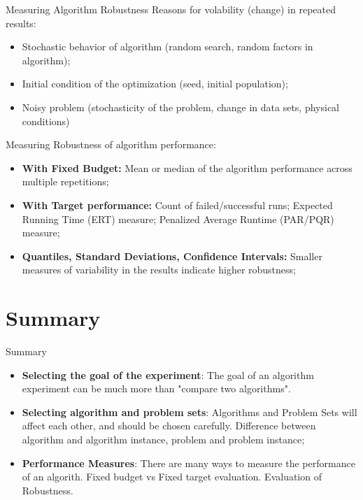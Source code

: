 \documentclass[aspectratio=169]{beamer}
\begin{document}
\begin{frame}[t]{Measuring Algorithm Robustness}
  Reasons for volability (change) in repeated results: 
  \begin{itemize}
    \item Stochastic behavior of algorithm (random search, random factors in algorithm);
    \item Initial condition of the optimization (seed, initial population);
    \item Noisy problem (stochasticity of the problem, change in data sets, physical conditions)
  \end{itemize}\bigskip

  Measuring Robustness of algorithm performance:
  \begin{itemize}
    \item {\bf With Fixed Budget:} Mean or median of the algorithm performance across multiple repetitions;
    \item {\bf With Target performance:} Count of failed/successful runs; Expected Running Time (ERT) measure; Penalized Average Runtime (PAR/PQR) measure;
    \item {\bf Quantiles, Standard Deviations, Confidence Intervals:} Smaller measures of variability in the results indicate higher robustness; 
  \end{itemize}
  
\end{frame}


\section{Summary}

\begin{frame}{Summary}
  \begin{itemize}
    \item {\bf Selecting the goal of the experiment}: The goal of an algorithm experiment can be much more than "compare two algorithms".

    \item {\bf Selecting algorithm and problem sets}: Algorithms and Problem Sets will affect each other, and should be chosen carefully. Difference between algorithm and algorithm instance, problem and problem instance;
    
    \item {\bf Performance Measures}: There are many ways to measure the performance of an algorith. Fixed budget vs Fixed target evaluation. Evaluation of Robustness.
  \end{itemize}
  
\end{frame}
\end{document}
